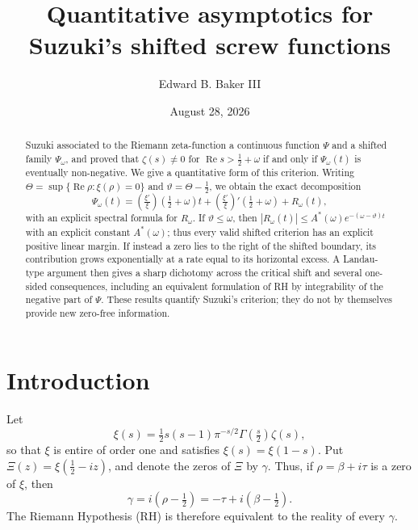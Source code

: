 \documentclass[11pt,reqno]{amsart}
\title[Shifted screw functions for the Riemann zeta-function]
      {Quantitative asymptotics for Suzuki's shifted screw functions}
\author{Edward B. Baker III}
\date{August 28, 2026}
\theoremstyle{plain}
\theoremstyle{definition}
\newcommand{\Rp}{\operatorname{Re}}
\newcommand{\lxi}[1]{\left(\tfrac{\xi'}{\xi}\right)\!#1}
\begin{document}
\begin{abstract}
Suzuki associated to the Riemann zeta-function a continuous function $\Psi$ and a shifted family
$\Psi_\omega$, and proved that $\zeta(s)\ne0$ for $\Rp s>\tfrac12+\omega$ if and only if
$\Psi_\omega(t)$ is eventually non-negative.  We give a quantitative form of this criterion.
Writing $\Theta=\sup\{\Rp\rho:\xi(\rho)=0\}$ and $\vartheta=\Theta-\tfrac12$, we obtain the exact
decomposition
\[
 \Psi_\omega(t)=\lxi{\left(\tfrac12+\omega\right)}t
 +\lxi{'\left(\tfrac12+\omega\right)}+R_\omega(t),
\]
with an explicit spectral formula for $R_\omega$.  If $\vartheta\le\omega$, then
$|R_\omega(t)|\le A^*(\omega)e^{-(\omega-\vartheta)t}$ with an explicit constant $A^*(\omega)$;
thus every valid shifted criterion has an
explicit positive linear margin.  If instead a zero lies to the right of the shifted boundary, its
contribution grows exponentially at a rate equal to its horizontal excess.  A Landau-type argument
then gives a sharp dichotomy across the critical shift and several one-sided consequences, including
an equivalent formulation of RH by integrability of the negative part of $\Psi$.  These results
quantify Suzuki's criterion; they do not by themselves provide new zero-free information.
\end{abstract}

\maketitle

\section{Introduction}

Let
\[
 \xi(s)=\tfrac12 s(s-1)\pi^{-s/2}\Gamma\!\left(\tfrac s2\right)\zeta(s),
\]
so that $\xi$ is entire of order one and satisfies $\xi(s)=\xi(1-s)$.  Put
$\Xi(z)=\xi(\tfrac12-iz)$, and denote the zeros of $\Xi$ by $\gamma$.  Thus, if
$\rho=\beta+i\tau$ is a zero of $\xi$, then
\begin{equation}\label{eq:gammarho}
 \gamma=i\left(\rho-\tfrac12\right)=-\tau+i\left(\beta-\tfrac12\right).
\end{equation}
The Riemann Hypothesis (RH) is therefore equivalent to the reality of every $\gamma$.
\end{document}
